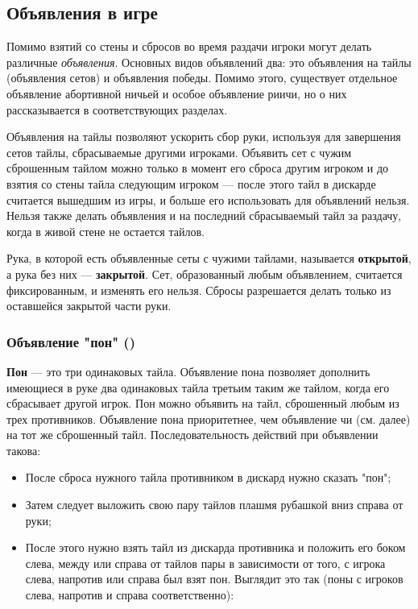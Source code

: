 \subsection{Объявления в игре}

Помимо взятий со стены и сбросов во время раздачи игроки могут делать различные \textit{объявления}. Основных видов объявлений два: это объявления на тайлы (объявления сетов) и объявления победы. Помимо этого, существует отдельное объявление абортивной ничьей и особое объявление риичи, но о них рассказывается в соответствующих разделах.

Объявления на тайлы позволяют ускорить сбор руки, используя для завершения сетов тайлы, сбрасываемые другими игроками. Объявить сет с чужим сброшенным тайлом можно только в момент его сброса другим игроком и до взятия со стены тайла следующим игроком --- после этого тайл в дискарде считается вышедшим из игры, и больше его использовать для объявлений нельзя. Нельзя также делать объявления и на последний сбрасываемый тайл за раздачу, когда в живой стене не остается тайлов. 

Рука, в которой есть объявленные сеты с чужими тайлами, называется \textbf{открытой}, а рука без них --- \textbf{закрытой}. Сет, образованный любым объявлением, считается фиксированным, и изменять его нельзя. Сбросы разрешается делать только из оставшейся закрытой части руки.

\subsubsection{Объявление "пон" ()}

\textbf{Пон} --- это три одинаковых тайла. Объявление пона позволяет дополнить имеющиеся в руке два одинаковых тайла третьим таким же тайлом, когда его сбрасывает другой игрок. Пон можно объявить на тайл, сброшенный любым из трех противников. Объявление пона приоритетнее, чем объявление чи (см. далее) на тот же сброшенный тайл. Последовательность действий при объявлении такова:

\begin{itemize}
	\item После сброса нужного тайла противником в дискард нужно сказать "пон";
	\item Затем следует выложить свою пару тайлов плашмя рубашкой вниз справа от руки;
	\item После этого нужно взять тайл из дискарда противника и положить его боком слева, между или справа от тайлов пары в зависимости от того, с игрока слева, напротив или справа был взят пон. Выглядит это так (поны с игроков слева, напротив и справа соответственно):
\end{itemize}


